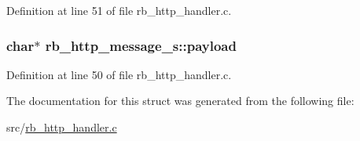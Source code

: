 Definition at line 51 of file rb\-\_\-http\-\_\-handler.\-c.

\hypertarget{structrb__http__message__s_a70cd28f794d09eb47cf19a37fb7ba42b}{
\subsubsection[{payload}]{\setlength{\rightskip}{0pt plus 5cm}char$\ast$ rb\-\_\-http\-\_\-message\-\_\-s\-::payload}}\label{structrb__http__message__s_a70cd28f794d09eb47cf19a37fb7ba42b}


Definition at line 50 of file rb\-\_\-http\-\_\-handler.\-c.



The documentation for this struct was generated from the following file\-:\begin{DoxyCompactItemize}
\item 
src/\hyperlink{rb__http__handler_8c}{rb\-\_\-http\-\_\-handler.\-c}\end{DoxyCompactItemize}
